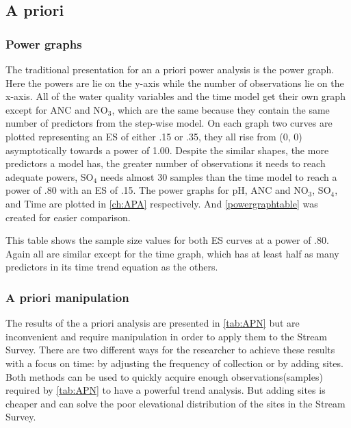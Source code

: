 \subsection{A priori}

\subsubsection{Power graphs}

The traditional presentation for an a priori power analysis is the power graph.
Here the powers are lie on the y-axis while the number of observations lie on the x-axis.
All of the water quality variables and the time model get their own graph except for ANC and NO$_3$, which are the same because they contain the same number of predictors from the step-wise model.
On each graph two curves are plotted representing an ES of either .15 or .35, they all rise from (0, 0) asymptotically towards a power of 1.00.
Despite the similar shapes, the more predictors a model has, the greater number of  observations it needs to reach adequate powers, SO$_4$ needs almost 30 samples than the time model to reach a power of .80 with an ES of .15.
The power graphs for pH, ANC and NO$_3$, SO$_4$, and Time are plotted in \autoref{ch:APA} respectively.
And \autoref{powergraphtable} was created for easier comparison.



This table shows the sample size values for both ES curves at a power of .80.
Again all are similar except for the time graph, which has at least half as many predictors in its time trend equation as the others.

\subsubsection{A priori manipulation}



The results of the a priori analysis are presented in \autoref{tab:APN} but are inconvenient and require manipulation in order to apply them to the Stream Survey.
There are two different ways for the researcher to achieve these results with a focus on time: by adjusting the frequency of collection or by adding sites.
Both methods can be used to quickly acquire enough observations(samples) required by \autoref{tab:APN} to have a powerful trend analysis.
But adding sites is cheaper and can solve the poor elevational distribution of the sites in the Stream Survey.

